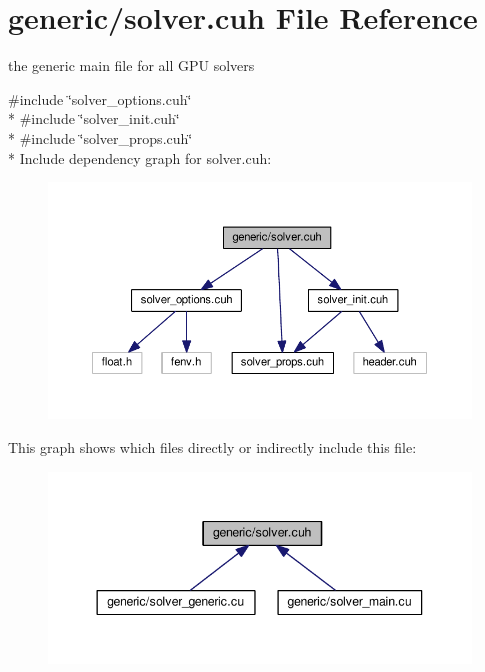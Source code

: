 \hypertarget{solver_8cuh}{}\section{generic/solver.cuh File Reference}
\label{solver_8cuh}


the generic main file for all G\+PU solvers  


{\ttfamily \#include \char`\"{}solver\+\_\+options.\+cuh\char`\"{}}\\*
{\ttfamily \#include \char`\"{}solver\+\_\+init.\+cuh\char`\"{}}\\*
{\ttfamily \#include \char`\"{}solver\+\_\+props.\+cuh\char`\"{}}\\*
Include dependency graph for solver.\+cuh\+:\nopagebreak
\begin{figure}[H]
\begin{center}
\leavevmode
\includegraphics[width=350pt]{solver_8cuh__incl}
\end{center}
\end{figure}
This graph shows which files directly or indirectly include this file\+:\nopagebreak
\begin{figure}[H]
\begin{center}
\leavevmode
\includegraphics[width=344pt]{solver_8cuh__dep__incl}
\end{center}
\end{figure}
